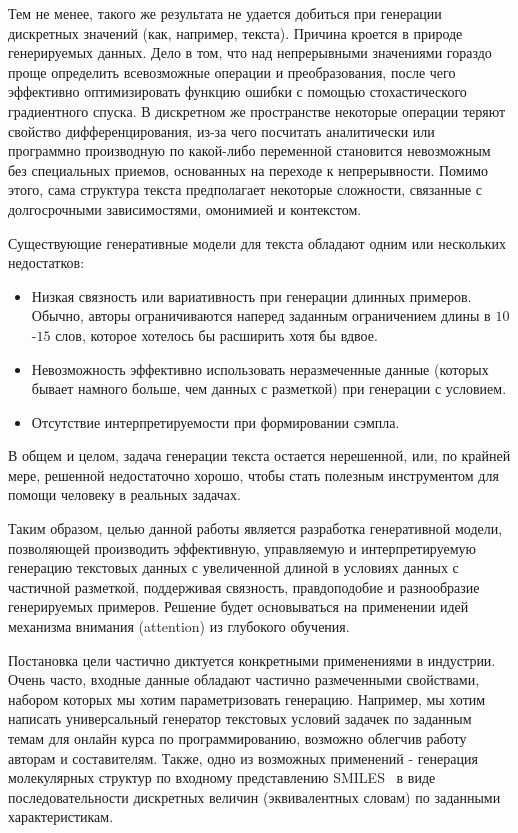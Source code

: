 \documentclass{spbau-diploma}
\begin{document}
Тем не менее, такого же результата не удается добиться при генерации дискретных 
значений (как, например, текста). Причина кроется в природе 
генерируемых данных. Дело в том, что над непрерывными значениями гораздо проще 
определить всевозможные операции и преобразования, после чего эффективно 
оптимизировать функцию ошибки с помощью стохастического градиентного спуска. В 
дискретном же пространстве некоторые операции теряют свойство дифференцирования, 
из-за чего посчитать аналитически или программно производную по какой-либо 
переменной становится невозможным без специальных приемов, основанных на 
переходе к непрерывности. Помимо этого, сама структура текста 
предполагает некоторые сложности, связанные с долгосрочными зависимостями, 
омонимией и контекстом.

Существующие генеративные модели для текста обладают одним или нескольких 
недостатков:
\begin{itemize}
    \item Низкая связность или вариативность при генерации длинных примеров. Обычно, авторы ограничиваются наперед заданным ограничением длины в $10$-$15$ слов, которое хотелось бы расширить хотя бы вдвое.
    \item Невозможность эффективно использовать неразмеченные данные (которых бывает намного больше, чем данных с разметкой) при генерации с условием.
    \item Отсутствие интерпретируемости при формировании сэмпла.
\end{itemize}
В общем и целом, задача генерации текста остается нерешенной, или, по крайней
мере, решенной недостаточно хорошо, чтобы стать полезным инструментом для 
помощи человеку в реальных задачах.

Таким образом, целью данной работы является разработка генеративной модели, 
позволяющей производить эффективную, управляемую и интерпретируемую генерацию 
текстовых данных с увеличенной длиной в условиях данных с частичной разметкой, 
поддерживая связность, правдоподобие и разнообразие генерируемых примеров. 
Решение будет основываться на применении идей механизма внимания (attention) 
из глубокого обучения.

Постановка цели частично диктуется конкретными применениями в индустрии. 
Очень часто, входные данные обладают частично размеченными свойствами, набором
которых мы хотим параметризовать генерацию.
Например, мы хотим написать универсальный генератор текстовых условий задачек по 
заданным темам для онлайн курса по программированию, возможно облегчив работу 
авторам и составителям. Также, одно из возможных применений - генерация 
молекулярных структур по входному представлению SMILES~\cite{wiki:smiles} в виде 
последовательности дискретных величин (эквивалентных словам) по заданными 
характеристикам.
\end{document}
